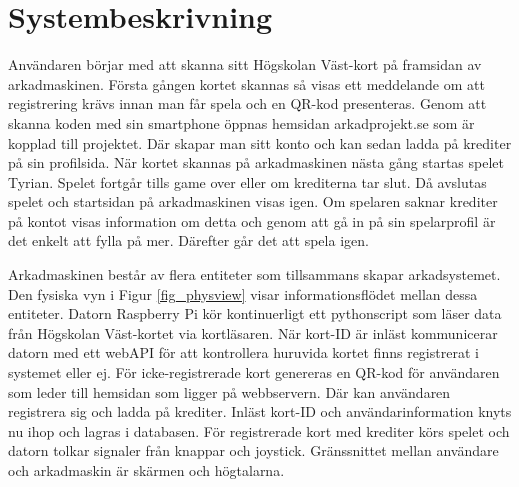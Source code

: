\documentclass[12pt,fleqn,openany]{book} %
\begin{document}
\section{Systembeskrivning}
Användaren börjar med att skanna sitt Högskolan Väst-kort på framsidan av arkadmaskinen. Första gången kortet skannas så visas ett 
meddelande om att registrering krävs innan man får spela och en QR-kod presenteras. Genom att skanna koden med sin smartphone öppnas 
hemsidan arkadprojekt.se som är kopplad till projektet. Där skapar man sitt konto och kan sedan ladda på krediter på sin profilsida. 
När kortet skannas på arkadmaskinen nästa gång startas spelet Tyrian. Spelet fortgår tills game over eller om krediterna tar slut. 
Då avslutas spelet och startsidan på arkadmaskinen visas igen. Om spelaren saknar krediter på kontot visas information om detta och 
genom att gå in på sin spelarprofil är det enkelt att fylla på mer. Därefter går det att spela igen.
\bigskip

Arkadmaskinen består av flera entiteter som tillsammans skapar arkadsystemet. Den fysiska vyn i Figur \ref{fig_physview} visar informationsflödet 
mellan dessa entiteter. Datorn Raspberry Pi kör kontinuerligt ett pythonscript som läser data från Högskolan Väst-kortet via kortläsaren. 
När kort-ID är inläst kommunicerar datorn med ett webAPI för att kontrollera huruvida kortet finns registrerat i systemet eller ej. För 
icke-registrerade kort genereras en QR-kod för användaren som leder till hemsidan som ligger på webbservern. Där kan användaren 
registrera sig och ladda på krediter. Inläst kort-ID och användarinformation knyts nu ihop och lagras i databasen.
För registrerade kort med krediter körs spelet och datorn tolkar signaler från knappar och joystick. Gränssnittet mellan användare och arkadmaskin är skärmen 
och högtalarna.
\end{document}
